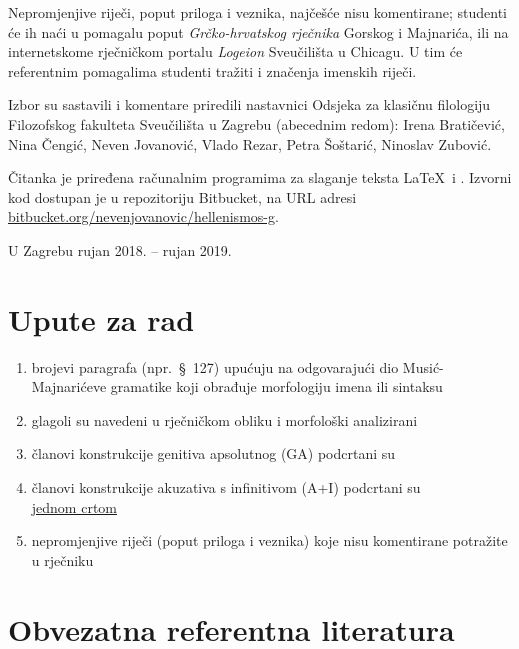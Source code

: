 \documentclass[a4paper,12pt,twoside]{report}
\begin{document}
Nepromjenjive riječi, poput priloga i veznika, najčešće nisu komentirane; studenti će ih naći u pomagalu poput \textit{Grčko-hrvatskog rječnika} Gorskog i Majnarića, ili na internetskome rječničkom portalu \textit{Logeion} Sveučilišta u Chicagu. U tim će referentnim pomagalima studenti tražiti i značenja imenskih riječi.

\newpage

Izbor su sastavili i komentare priredili nastavnici Odsjeka za klasičnu filologiju Filozofskog fakulteta Sveučilišta u Zagrebu (abecednim redom): Irena Bratičević, Nina Čengić, Neven Jovanović, Vlado Rezar, Petra Šoštarić, Ninoslav Zubović.

Čitanka je priređena računalnim programima za slaganje teksta \LaTeX\ i \XeLaTeX. Izvorni kod dostupan je u repozitoriju Bitbucket, na URL adresi \href{https://bitbucket.org/nevenjovanovic/hellenismos-g}{bitbucket.org/nevenjovanovic/hellenismos-g}.

\medskip

U Zagrebu rujan 2018. – rujan 2019.

\newpage



\section*{Upute za rad}

\begin{enumerate}[label=\alph*)]
\item brojevi paragrafa (npr.\ §~127) upućuju na odgovarajući dio Musić-Majnarićeve gramatike koji obrađuje morfologiju imena ili sintaksu
\item glagoli su navedeni u rječničkom obliku i morfološki analizirani
\item članovi konstrukcije genitiva apsolutnog (GA) podcrtani su \\
\item članovi konstrukcije akuzativa s infinitivom (A+I) podcrtani su \\ \underline{jednom crtom}
\item nepromjenjive riječi (poput priloga i veznika) koje nisu komentirane potražite u rječniku
\end{enumerate}


\section*{Obvezatna referentna literatura}
\end{document}

